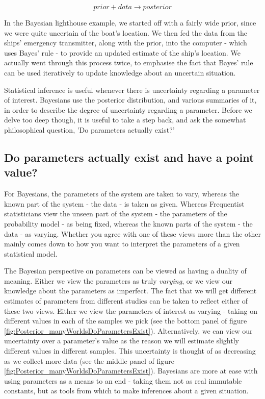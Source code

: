 \documentclass[11pt,fullpage]{book}
\begin{document}
\begin{equation}
prior + data \rightarrow posterior
\end{equation}

In the Bayesian lighthouse example, we started off with a fairly wide prior, since we were quite uncertain of the boat's location. We then fed the data from the ships' emergency transmitter, along with the prior, into the computer - which uses Bayes' rule - to provide an updated estimate of the ship's location. We actually went through this process twice, to emphasise the fact that Bayes' rule can be used iteratively to update knowledge about an uncertain situation.

Statistical inference is useful whenever there is uncertainty regarding a parameter of interest. Bayesians use the posterior distribution, and various summaries of it, in order to describe the degree of uncertainty regarding a parameter. Before we delve too deep though, it is useful to take a step back, and ask the somewhat philosophical question, 'Do parameters actually exist?' 

\subsection{Do parameters actually exist and have a point value?}\label{sec:Posterior_parametersExist}
For Bayesians, the parameters of the system are taken to vary, whereas the known part of the system - the data - is taken as given. Whereas Frequentist statisticians view the unseen part of the system - the parameters of the probability model - as being fixed, whereas the known parts of the system - the data - as varying. Whether you agree with one of these views more than the other mainly comes down to how you want to interpret the parameters of a given statistical model. 

The Bayesian perspective on parameters can be viewed as having a duality of meaning. Either we view the parameters as truly \textit{varying}, or we view our knowledge about the parameters as imperfect. The fact that we will get different estimates of parameters from different studies can be taken to reflect either of these two views. Either we view the parameters of interest as varying - taking on different values in each of the samples we pick (see the bottom panel of figure \ref{fig:Posterior_manyWorldsDoParametersExist}). Alternatively, we can view our uncertainty over a parameter's value as the reason we will estimate slightly different values in different samples. This uncertainty is thought of as decreasing as we collect more data (see the middle panel of figure \ref{fig:Posterior_manyWorldsDoParametersExist}). Bayesians are more at ease with using parameters as a means to an end - taking them not as real immutable constants, but as tools from which to make inferences about a given situation.
\end{document}
